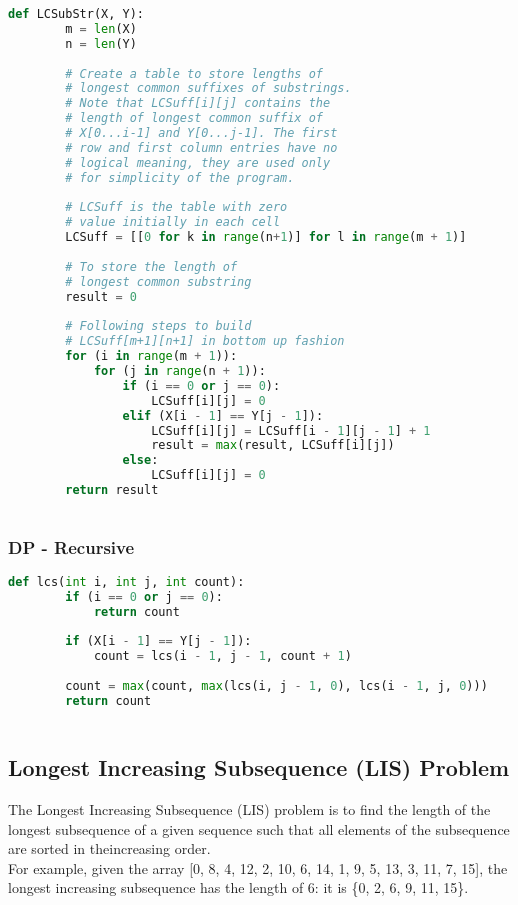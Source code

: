 \documentclass[12pt]{article}
\begin{document}
	\begin{lstlisting}[language=Python]
	def LCSubStr(X, Y): 
    	m = len(X) 
        n = len(Y) 
        
        # Create a table to store lengths of 
        # longest common suffixes of substrings.  
        # Note that LCSuff[i][j] contains the  
        # length of longest common suffix of  
        # X[0...i-1] and Y[0...j-1]. The first 
        # row and first column entries have no 
        # logical meaning, they are used only 
        # for simplicity of the program. 
          
        # LCSuff is the table with zero  
        # value initially in each cell 
        LCSuff = [[0 for k in range(n+1)] for l in range(m + 1)] 
          
        # To store the length of  
        # longest common substring 
        result = 0 
      
        # Following steps to build 
        # LCSuff[m+1][n+1] in bottom up fashion 
        for (i in range(m + 1)): 
            for (j in range(n + 1)): 
                if (i == 0 or j == 0): 
                    LCSuff[i][j] = 0
                elif (X[i - 1] == Y[j - 1]): 
                    LCSuff[i][j] = LCSuff[i - 1][j - 1] + 1
                    result = max(result, LCSuff[i][j]) 
                else: 
                    LCSuff[i][j] = 0
        return result 
        
    \end{lstlisting}
	\subsubsection{DP - Recursive}
	
	\begin{lstlisting}[language=Python]
	def lcs(int i, int j, int count):
        if (i == 0 or j == 0):
            return count
              
        if (X[i - 1] == Y[j - 1]):
            count = lcs(i - 1, j - 1, count + 1)
            
        count = max(count, max(lcs(i, j - 1, 0), lcs(i - 1, j, 0))) 
        return count
        
    \end{lstlisting}
	\subsection{Longest Increasing Subsequence (LIS) Problem}
	The Longest Increasing Subsequence (LIS) problem is to find the length of the longest subsequence of a given sequence such that all elements of the subsequence are sorted in theincreasing order.\\
	For example, given the array [0, 8, 4, 12, 2, 10, 6, 14, 1, 9, 5, 13, 3, 11, 7, 15], the longest increasing subsequence has the length of 6: it is \{0, 2, 6, 9, 11, 15\}.
\end{document}
